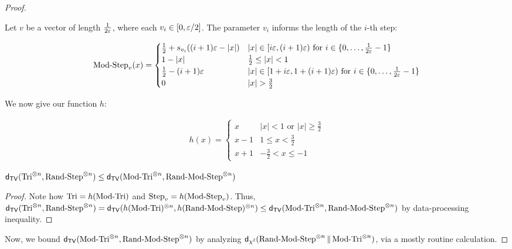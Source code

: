 \begin{proof}
\begin{definition} Let $v$ be a vector of length $\frac{1}{2\varepsilon}$, where each $v_i \in [0,\varepsilon/2]$. The parameter $v_i$ informs the length of the $i$-th step:

    \begin{align*}
     \mstep_v(x) = \begin{cases} 
          \frac{1}{2} + s_{v_i}((i+1)\eps - |x|) & |x| \in [i\eps,(i+1)\eps) \textrm{ for } i \in \{0,\dots,\frac{1}{2\eps}-1\}\\
          1-|x| & \frac{1}{2} \le |x| < 1 \\
          \frac{1}{2} - (i+1)\eps & |x| \in [1+i\eps,1+(i+1)\eps) \textrm{ for } i \in \{0,\dots,\frac{1}{2\eps}-1\}\\
          0 & |x|>\frac{3}{2}
       \end{cases}
    \end{align*}
\end{definition}

We now give our function $h$:

\begin{definition}
    \begin{align*}
     h(x) = \begin{cases} 
          x & |x|<1 \textrm{ or } |x| \ge \frac{3}{2}\\
          x-1 & 1 \le x < \frac{3}{2}\\
          x + 1 & -\frac{3}{2}< x \le -1
       \end{cases}
    \end{align*}
\end{definition}

\begin{claim}\label{claim:use-dpi}
    $\mathsf{d_{TV}}(\operatorname{Tri}^{\otimes n},\operatorname{Rand-Step}^{\otimes n}) \le \mathsf{d_{TV}}(\operatorname{Mod-Tri}^{\otimes n},\operatorname{Rand-Mod-Step}^{\otimes n})$
\end{claim}
\begin{proof}
    Note how $\operatorname{Tri}=h(\operatorname{Mod-Tri})$ and $\operatorname{Step}_v = h(\operatorname{Mod-Step}_v)$. Thus, 
    $\mathsf{d_{TV}}(\operatorname{Tri}^{\otimes n},\operatorname{Rand-Step}^{\otimes n}) = \mathsf{d_{TV}}(h(\operatorname{Mod-Tri})^{\otimes n},h(\operatorname{Rand-Mod-Step})^{\otimes n}) \le \mathsf{d_{TV}}(\operatorname{Mod-Tri}^{\otimes n},\operatorname{Rand-Mod-Step}^{\otimes n})$ by data-processing inequality.
\end{proof}

Now, we bound $\mathsf{d_{TV}}(\operatorname{Mod-Tri}^{\otimes n},\operatorname{Rand-Mod-Step}^{\otimes n})$ by analyzing $\mathsf{d_{\chi^2}}(\operatorname{Rand-Mod-Step}^{\otimes n}\| \operatorname{Mod-Tri}^{\otimes n})$, via a mostly routine calculation.


\end{proof}
